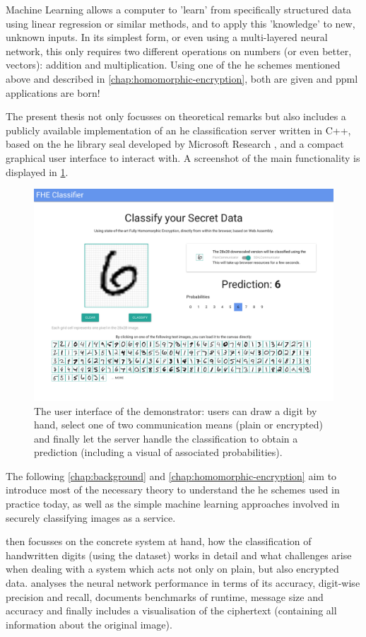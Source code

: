 Machine Learning allows a computer to 'learn' from specifically structured data using linear regression or similar methods, and to apply this 'knowledge' to new, unknown inputs.
In its simplest form, or even using a multi-layered neural network, this only requires two different operations on numbers (or even better, vectors): addition and multiplication.
Using one of the \gls{he} schemes mentioned above and described in \cref{chap:homomorphic-encryption}, both are given and \gls{ppml} applications are born!

The present thesis not only focusses on theoretical remarks but also includes a publicly available implementation of an \gls{he} classification server written in C++, based on the \glsdesc{he} library \gls{seal} developed by Microsoft Research \parencite{seal-4.0}, and a compact graphical user interface to interact with.
A screenshot of the main functionality is displayed in \cref{fig:frontend}.

\begin{figure}[H]
  \centering
  \includegraphics[width=\linewidth]{figures/frontend.pdf}
  \vspace{-1.2cm}
  \caption[User interface of the demonstrator]{The user interface of the demonstrator: users can draw a digit by hand, select one of two communication means (plain or encrypted) and finally let the server handle the classification to obtain a prediction (including a visual of associated probabilities).}
  \label{fig:frontend}
\end{figure}

The following \cref{chap:background} and \cref{chap:homomorphic-encryption} aim to introduce most of the necessary theory to understand the \gls{he} schemes used in practice today, as well as the simple machine learning approaches involved in securely classifying images as a service.

 then focusses on the concrete system at hand, how the classification of handwritten digits (using the  dataset) works in detail and what challenges arise when dealing with a system which acts not only on plain, but also encrypted data.
 analyses the neural network performance in terms of its accuracy, digit-wise precision and recall, documents benchmarks of runtime, message size and accuracy and finally includes a visualisation of the ciphertext (containing all information about the original image).
